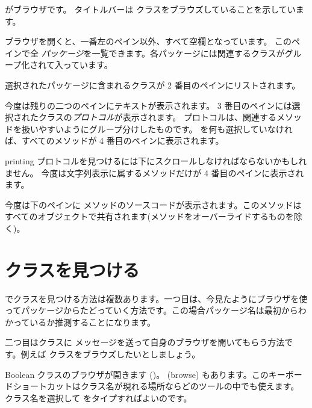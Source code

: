 \documentclass[a4paper,10pt,twoside]{book}
\begin{document}
 がブラウザです。
タイトルバーは  クラスをブラウズしていることを示しています。

ブラウザを開くと、一番左のペイン以外、すべて空欄となっています。
このペインで全 \emph{パッケージ}を一覧できます。各パッケージには関連するクラスがグループ化されて入っています。

選択されたパッケージに含まれるクラスが 2 番目のペインにリストされます。

今度は残りの二つのペインにテキストが表示されます。
3 番目のペインには選択されたクラスの\emph{プロトコル}が表示されます。
プロトコルは、関連するメソッドを扱いやすいようにグループ分けしたものです。
を何も選択していなければ、すべてのメソッドが 4 番目のペインに表示されます。

printing プロトコルを見つけるには下にスクロールしなければならないかもしれません。
今度は文字列表示に属するメソッドだけが 4 番目のペインに表示されます。

今度は下のペインに  メソッドのソースコードが表示されます。このメソッドはすべてのオブジェクトで共有されます(メソッドをオーバーライドするものを除く)。

\section{クラスを見つける}

\pharo でクラスを見つける方法は複数あります。一つ目は、今見たようにブラウザを使ってパッケージからたどっていく方法です。この場合パッケージ名は最初からわかっているか推測することになります。

二つ目はクラスに  メッセージを送って自身のブラウザを開いてもらう方法です。例えば クラスをブラウズしたいとしましょう。

Boolean クラスのブラウザが開きます ()。
  (browse) もあります。このキーボードショートカットはクラス名が現れる場所ならどのツールの中でも使えます。
クラス名を選択して  をタイプすればよいのです。
\end{document}
